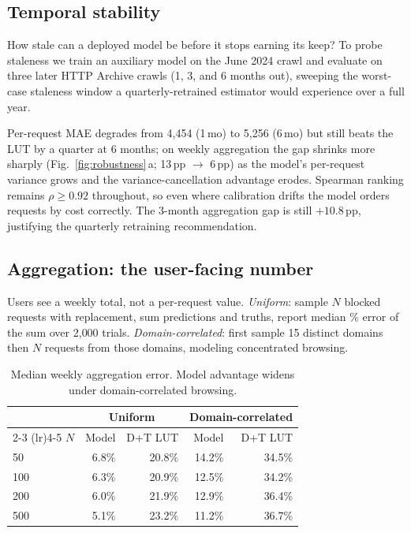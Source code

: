 \documentclass[10pt,sigconf,letterpaper,anonymous]{acmart}
\begin{document}
\subsection{Temporal stability}
\label{sec:robustness-temporal}

How stale can a deployed model be before it stops earning its keep?
To probe staleness we train an auxiliary model on the June 2024 crawl and evaluate on three later HTTP Archive crawls (1, 3, and 6 months out), sweeping the worst-case staleness window a quarterly-retrained estimator would experience over a full year.

Per-request MAE degrades from 4{,}454 (1\,mo) to 5{,}256 (6\,mo) but still beats the LUT by a quarter at 6 months; on weekly aggregation the gap shrinks more sharply (Fig.~\ref{fig:robustness}\,a; 13\,pp $\to$ 6\,pp) as the model's per-request variance grows and the variance-cancellation advantage erodes. Spearman ranking remains $\rho{\geq}0.92$ throughout, so even where calibration drifts the model orders requests by cost correctly. The 3-month aggregation gap is still $+10.8$\,pp, justifying the quarterly retraining recommendation.

\subsection{Aggregation: the user-facing number}
\label{sec:robustness-agg}

Users see a weekly total, not a per-request value. \emph{Uniform}: sample $N$ blocked requests with replacement, sum predictions and truths, report median \% error of the sum over 2{,}000 trials. \emph{Domain-correlated}: first sample 15 distinct domains then $N$ requests from those domains, modeling concentrated browsing.

\begin{table}[!ht]
\centering
\small
\begin{tabular}{lrrrr}
\toprule
& \multicolumn{2}{c}{Uniform} & \multicolumn{2}{c}{Domain-correlated} \\
\cmidrule(lr){2-3} \cmidrule(lr){4-5}
$N$ & Model & D+T LUT & Model & D+T LUT \\
\midrule
50  & 6.8\% & 20.8\% & 14.2\% & 34.5\% \\
100 & 6.3\% & 20.9\% & 12.5\% & 34.2\% \\
200 & 6.0\% & 21.9\% & 12.9\% & 36.4\% \\
500 & 5.1\% & 23.2\% & 11.2\% & 36.7\% \\
\bottomrule
\end{tabular}
\caption{Median weekly aggregation error. Model advantage widens under domain-correlated browsing.}
\label{tab:aggregation}
\end{table}
\end{document}
